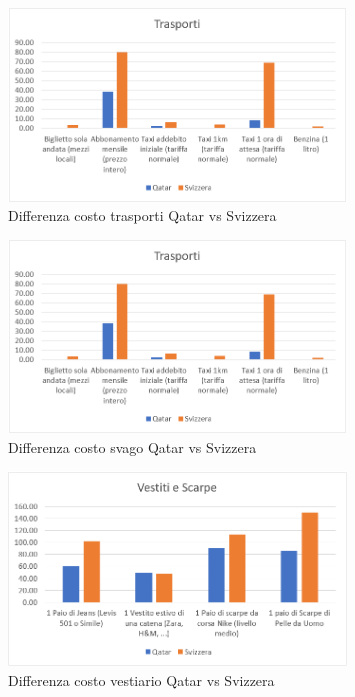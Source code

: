\documentclass[a4paper, 12pt]{article}
\begin{document}
\begin{figure}[h]
    \centering
    \includegraphics[width=0.8\textwidth]{images/trasporti.png}
    \caption{Differenza costo trasporti Qatar vs Svizzera}
\end{figure}

\pagebreak

\begin{figure}[h]
    \centering
    \includegraphics[width=0.8\textwidth]{images/svago.png}
    \caption{Differenza costo svago Qatar vs Svizzera}
\end{figure}

\begin{figure}[h]
    \centering
    \includegraphics[width=0.8\textwidth]{images/vestiti.png}
    \caption{Differenza costo vestiario Qatar vs Svizzera}
\end{figure}
\end{document}
